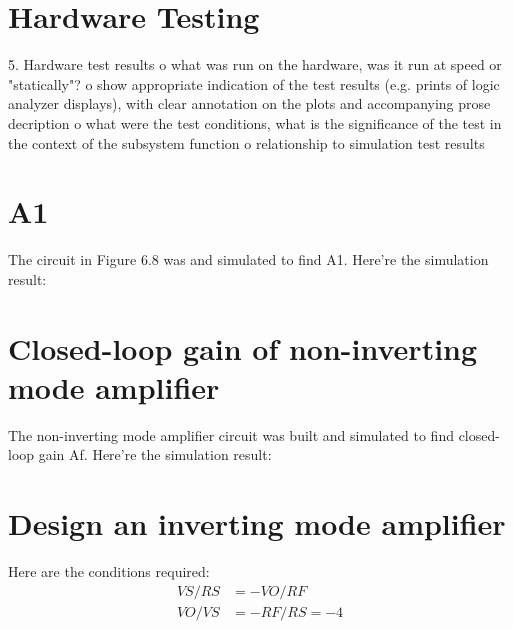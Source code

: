 \documentclass[letterpaper, 12pt]{article} %
\begin{document}
\section{Hardware Testing}
    5.  Hardware test results
         o  what was run on the hardware, was it run at speed or "statically"?
         o  show appropriate indication of the test results (e.g. prints of
            logic analyzer displays), with clear annotation on the plots and
            accompanying prose decription
         o  what were the test conditions, what is the significance of the test
            in the context of the subsystem function
         o  relationship to simulation test results

\section{A1}
The circuit in Figure 6.8 was and simulated to find A1. Here're the simulation result:

\begin{minipage}{1.0\textwidth}
\centering
{}
\centering
\end{minipage}
\bigskip

\section{Closed-loop gain of non-inverting mode amplifier}

The non-inverting mode amplifier circuit was built and simulated to find closed-loop gain Af. Here're the simulation result:


\section{Design an inverting mode amplifier}

Here are the conditions required:
\begin{align*}
VS/RS&=-VO/RF\\
VO/VS&=-RF/RS=-4\\
\end{align*}
\end{document}
